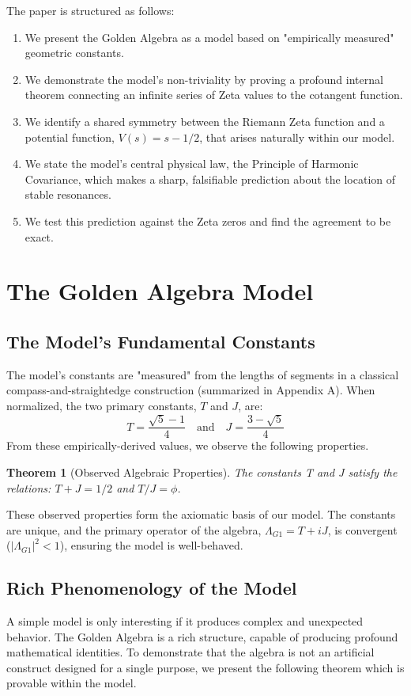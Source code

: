 \documentclass{article}
\theoremstyle{plain}
\newtheorem{theorem}{Theorem}[section]
\theoremstyle{definition}
\theoremstyle{remark}
\begin{document}
The paper is structured as follows:
\begin{enumerate}
    \item We present the Golden Algebra as a model based on "empirically measured" geometric constants.
    \item We demonstrate the model's non-triviality by proving a profound internal theorem connecting an infinite series of Zeta values to the cotangent function.
    \item We identify a shared symmetry between the Riemann Zeta function and a potential function, $V(s) = s-1/2$, that arises naturally within our model.
    \item We state the model's central physical law, the Principle of Harmonic Covariance, which makes a sharp, falsifiable prediction about the location of stable resonances.
    \item We test this prediction against the Zeta zeros and find the agreement to be exact.
\end{enumerate}

\section{The Golden Algebra Model}
\subsection{The Model's Fundamental Constants}
The model's constants are "measured" from the lengths of segments in a classical compass-and-straightedge construction (summarized in Appendix A). When normalized, the two primary constants, $T$ and $J$, are:
$$ T = \frac{\sqrt{5}-1}{4} \quad \text{and} \quad J = \frac{3-\sqrt{5}}{4} $$
From these empirically-derived values, we observe the following properties.

\begin{theorem}[Observed Algebraic Properties]
The constants T and J satisfy the relations: $T+J = 1/2$ and $T/J = \phi$.
\end{theorem}

These observed properties form the axiomatic basis of our model. The constants are unique, and the primary operator of the algebra, $\Lambda_{G1} = T+iJ$, is convergent ($|\Lambda_{G1}|^2 < 1$), ensuring the model is well-behaved.

\subsection{Rich Phenomenology of the Model}
A simple model is only interesting if it produces complex and unexpected behavior. The Golden Algebra is a rich structure, capable of producing profound mathematical identities. To demonstrate that the algebra is not an artificial construct designed for a single purpose, we present the following theorem which is provable within the model.
\end{document}
